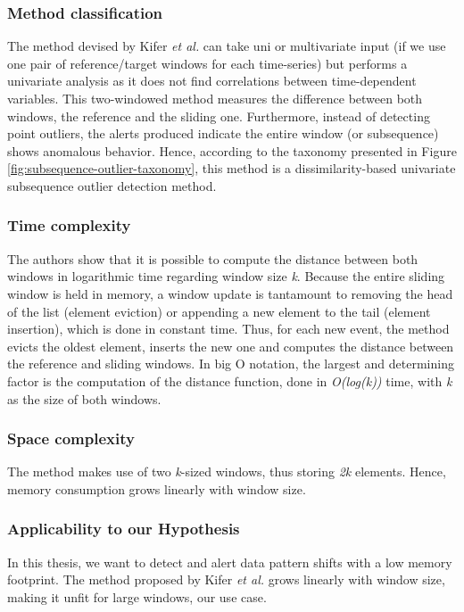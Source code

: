 \subsubsection*{Method classification}
The method devised by Kifer \emph{et al.} can take uni or multivariate input (if we use one pair of reference/target windows for each time-series) but performs a univariate analysis as it does not find correlations between time-dependent variables. This two-windowed method measures the difference between both windows, the reference and the sliding one. Furthermore, instead of detecting point outliers, the alerts produced indicate the entire window (or subsequence) shows anomalous behavior. Hence, according to the taxonomy presented in Figure \ref{fig:subsequence-outlier-taxonomy}, this method is a dissimilarity-based univariate subsequence outlier detection method.

\subsubsection*{Time complexity}
The authors show that it is possible to compute the distance between both windows in logarithmic time regarding window size \textit{k}. Because the entire sliding window is held in memory, a window update is tantamount to removing the head of the list (element eviction) or appending a new element to the tail (element insertion), which is done in constant time. Thus, for each new event, the method evicts the oldest element, inserts the new one and computes the distance between the reference and sliding windows. In big O notation, the largest and determining factor is the computation of the distance function, done in \textit{O(log(k))} time, with \textit{k} as the size of both windows.

\subsubsection*{Space complexity}
The method makes use of two \textit{k}-sized windows, thus storing \textit{2k} elements. Hence, memory consumption grows linearly with window size.

\subsubsection*{Applicability to our Hypothesis}
In this thesis, we want to detect and alert data pattern shifts with a low memory footprint. The method proposed by Kifer \emph{et al.} grows linearly with window size, making it unfit for large windows, our use case.

